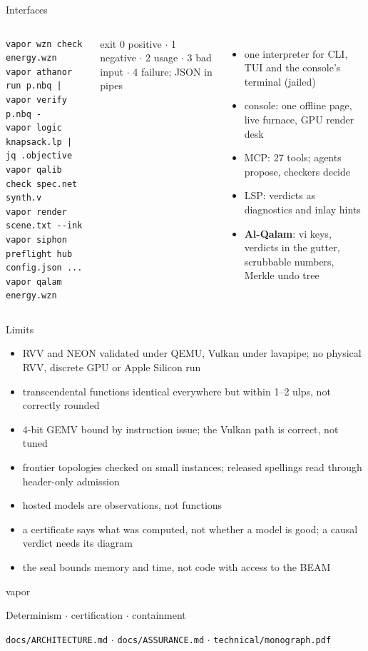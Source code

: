 \documentclass[aspectratio=169,11pt]{beamer}
\begin{document}
\begin{frame}[fragile]{Interfaces}
\begin{columns}[T]
\begin{lstlisting}[basicstyle=\ttfamily\footnotesize]
vapor wzn check energy.wzn
vapor athanor run p.nbq | vapor verify p.nbq -
vapor logic knapsack.lp | jq .objective
vapor qalib check spec.net synth.v
vapor render scene.txt --ink
vapor siphon preflight hub config.json ...
vapor qalam energy.wzn
\end{lstlisting}
\small exit 0 positive $\cdot$ 1 negative $\cdot$ 2 usage $\cdot$ 3 bad input $\cdot$ 4 failure; JSON in pipes
\small
\begin{itemize}
\item one interpreter for CLI, TUI and the console's terminal (jailed)
\item console: one offline page, live furnace, GPU render desk
\item MCP: 27 tools; agents propose, checkers decide
\item LSP: verdicts as diagnostics and inlay hints
\item \textbf{Al-Qalam}: vi keys, verdicts in the gutter, scrubbable numbers, Merkle undo tree
\end{itemize}
\end{columns}
\end{frame}

\begin{frame}{Limits}
\small
\begin{itemize}
\item RVV and NEON validated under QEMU, Vulkan under lavapipe; no physical RVV, discrete GPU or Apple Silicon run
\item transcendental functions identical everywhere but within 1--2 ulps, not correctly rounded
\item 4-bit GEMV bound by instruction issue; the Vulkan path is correct, not tuned
\item frontier topologies checked on small instances; released spellings read through header-only admission
\item hosted models are observations, not functions
\item a certificate says what was computed, not whether a model is good; a causal verdict needs its diagram
\item the seal bounds memory and time, not code with access to the BEAM
\end{itemize}
\end{frame}

\begin{frame}
\centering
\vspace{2em}
{\Huge vapor}

\vspace{1em}
\Large Determinism $\cdot$ certification $\cdot$ containment

\vspace{2em}
\normalsize \texttt{docs/ARCHITECTURE.md} $\cdot$ \texttt{docs/ASSURANCE.md} $\cdot$ \texttt{technical/monograph.pdf}
\end{frame}
\end{document}
